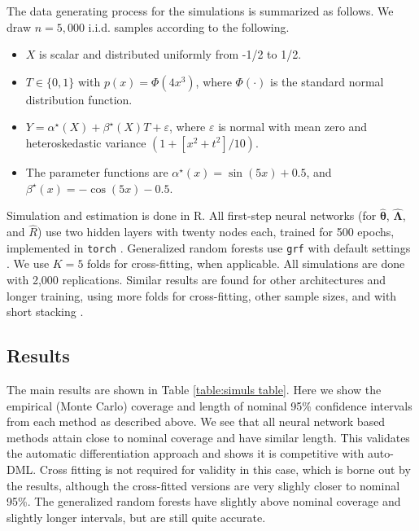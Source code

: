 \documentclass[12pt]{article}
\numberwithin{equation}{section}
\theoremstyle{definition}
\newcommand{\bL}{\boldsymbol{\Lambda}}
\newcommand{\atrue}{\alpha^\star}
\newcommand{\btrue}{\beta^\star}
\newcommand{\bthat}{\bm{\widehat{\theta}}}
\newcommand{\bLhat}{\widehat{\bL}}
\begin{document}
\begin{appendices}
The data generating process for the simulations is summarized as follows. We draw $n=5,000$ i.i.d. samples according to the following.
\begin{itemize}
    \item $X$ is scalar and distributed uniformly from -1/2 to 1/2.
    \item $T \in \{0,1\}$ with $p(x) = \Phi(4x^3)$, where $\Phi(\cdot)$ is the standard normal distribution function.
    \item $Y = \atrue(X) + \btrue(X)T + \varepsilon$, where $\varepsilon$ is normal with mean zero and heteroskedastic variance $(1 + [x^2 + t^2]/10)$.
    \item The parameter functions are $\atrue(x) = \sin(5x) + 0.5$, and $\btrue(x) =  -\cos(5x) - 0.5$.
\end{itemize}

Simulation and estimation is done in {\sf R}. All first-step neural networks (for $\bthat$, $\bLhat$, and $\widehat{R}$) use two hidden layers with twenty nodes each, trained for 500 epochs, implemented in \verb|torch| \citep{Keydana2023_book}. Generalized random forests use \verb|grf| with default settings \citep{Athey-Tibshirani-Wager2019_AoS}. We use $K=5$ folds for cross-fitting, when applicable. All simulations are done with 2,000 replications. Similar results are found for other architectures and longer training, using more folds for cross-fitting, other sample sizes, and with short stacking \citep{Ahrens-Hansen-Schaffer-Wiemann2025_JAE}. 




\subsection{Results}


The main results are shown in Table \ref{table:simuls table}. Here we show the empirical (Monte Carlo) coverage and length of nominal 95\% confidence intervals from each method as described above. We see that all neural network based methods attain close to nominal coverage and have similar length. This validates the automatic differentiation approach and shows it is competitive with auto-DML. Cross fitting is not required for validity in this case, which is borne out by the results, although the cross-fitted versions are very slighly closer to nominal 95\%. The generalized random forests have slightly above nominal coverage and slightly longer intervals, but are still quite accurate. 


\end{appendices}
\end{document}

